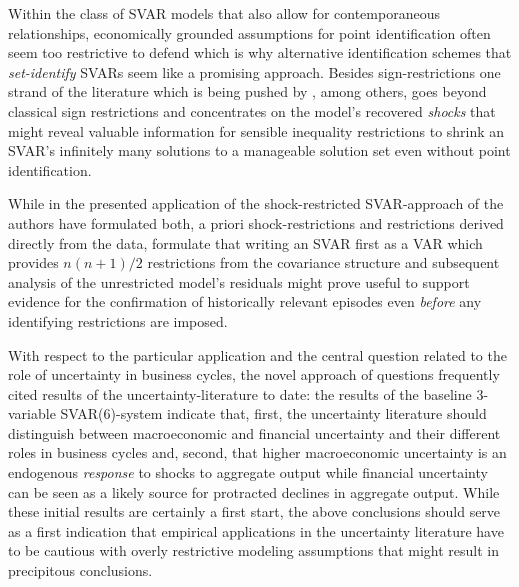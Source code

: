 \documentclass[a4paper,11pt,listof=nochaptergap,oneside,pointednumbers,bibtotoc,bigheadings,liststotoc,hidelinks]{scrbook}
\theoremstyle{mysatz}
\theoremstyle{mydefinition}
\theoremstyle{mytheorem}
\theoremstyle{mybemerkung}
\begin{document}
Within the class of SVAR models that also allow for contemporaneous relationships, economically grounded assumptions for point identification often seem too restrictive to defend which is why alternative identification schemes that \textit{set-identify} \citep{granzieraetal:18} SVARs seem like a promising approach. Besides sign-restrictions one strand of the literature which is being pushed by \citet{ludvigsonetal:20a}, among others, goes beyond classical sign restrictions and concentrates on the model's recovered \textit{shocks} that might reveal valuable information for sensible inequality restrictions to shrink an SVAR's infinitely many solutions to a manageable solution set even without point identification. 

While in the presented application of the shock-restricted SVAR-approach of \citet{ludvigsonetal:19} the authors have formulated both, a priori shock-restrictions and restrictions derived directly from the data, \citet{ludvigsonetal:20a} formulate that writing an SVAR first as a VAR which provides $n(n+1)/2$ restrictions from the covariance structure and subsequent analysis of the unrestricted model's residuals might prove useful to support evidence for the confirmation of historically relevant episodes even \textit{before} any identifying restrictions are imposed.

With respect to the particular application and the central question related to the role of uncertainty in business cycles, the novel approach of \citet{ludvigsonetal:18, ludvigsonetal:19} questions frequently cited results of the uncertainty-literature to date: the results of the baseline 3-variable SVAR(6)-system indicate that, first, the uncertainty literature should distinguish between macroeconomic and financial uncertainty and their different roles in business cycles and, second, that higher macroeconomic uncertainty is an endogenous \textit{response} to shocks to aggregate output while financial uncertainty can be seen as a likely source for protracted declines in aggregate output. While these initial results are certainly a first start, the above conclusions should serve as a first indication that empirical applications in the uncertainty literature have to be cautious with overly restrictive modeling assumptions that might result in precipitous conclusions.\\
\end{document}
